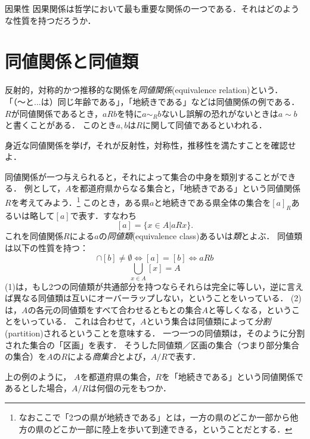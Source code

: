\documentclass[dvipdfmx, 11pt,a4paper]{jsarticle}
\begin{document}
\begin{rei}{因果性}{}
 因果関係は哲学において最も重要な関係の一つである．それはどのような性質を持つだろうか．
\end{rei}


\section{同値関係と同値類}
反射的，対称的かつ推移的な関係を\emph{同値関係}(equivalence relation)という．
「（〜と...は）同じ年齢である」，「地続きである」などは同値関係の例である．
$R$が同値関係であるとき，$aRb$を特に$a\sim_R b$ないし誤解の恐れがないときは$a \sim b$と書くことがある．
このとき$a,b$は$R$に関して同値であるといわれる．

\begin{renshu}{}{}
 身近な同値関係を挙げ，それが反射性，対称性，推移性を満たすことを確認せよ．
\end{renshu}

\begin{answer}
 
\end{answer}

同値関係が一つ与えられると，それによって集合の中身を類別することができる．
例として，$A$を都道府県からなる集合と，「地続きである」という同値関係$R$を考えてみよう．\footnote{なおここで「2つの県が地続きである」とは，一方の県のどこか一部から他方の県のどこか一部に陸上を歩いて到達できる，ということだとする．}
このとき，ある県$a$と地続きである県全体の集合を$[a]_R$あるいは略して$[a]$で表す．すなわち
\[
 [a] = \{x \in A | aRx\}.
\]
これを同値関係$R$による$a$の\emph{同値類}(equivalence class)あるいは\emph{類}とよぶ．
同値類は以下の性質を持つ：
\begin{equation}
[a] \cap [b] \neq \emptyset  \iff [a] = [b] \iff aRb
\end{equation}
\begin{equation}
\bigcup_{x \in A} [x] = A
\end{equation}
(1)は，もし2つの同値類が共通部分を持つならそれらは完全に等しい，逆に言えば異なる同値類は互いにオーバーラップしない，ということをいっている．
(2)は，$A$の各元の同値類をすべて合わせるともとの集合$A$と等しくなる，ということをいっている．
これは合わせて，$A$という集合は同値類によって\emph{分割}(partition)されるということを意味する．
一つ一つの同値類は，そのように分割された集合の「区画」を表す．
そうした同値類／区画の集合（つまり部分集合の集合）を$A$の$R$による\emph{商集合}とよび，$A/R$で表す．

\begin{renshu}{}{}
上の例のように， $A$を都道府県の集合，$R$を「地続きである」という同値関係であるとした場合，$A/R$は何個の元をもつか．
\end{renshu}
\end{document}
